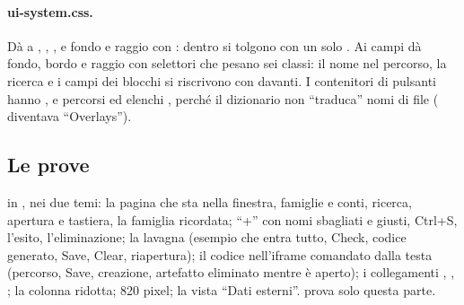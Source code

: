 \paragraph{ui-system.css.} Dà a , ,
,  e  fondo e raggio con
: dentro  si tolgono con un solo
. Ai campi dà fondo, bordo e raggio con selettori che
pesano sei classi: il nome nel percorso, la ricerca e i campi dei blocchi si
riscrivono con  davanti. I contenitori di pulsanti hanno
, e percorsi ed elenchi ,
perché il dizionario non \enquote{traduca} nomi di file
( diventava \enquote{Overlays}).

\subsection{Le prove}

 in , nei due temi: la pagina
che sta nella finestra, famiglie e conti, ricerca, apertura e tastiera, la
famiglia ricordata; \enquote{+} con nomi sbagliati e giusti, Ctrl+S,
l'esito, l'eliminazione; la lavagna (esempio che entra tutto, Check, codice
generato, Save, Clear, riapertura); il codice nell'iframe comandato dalla
testa (percorso, Save, creazione, artefatto eliminato mentre è aperto); i
collegamenti , ,
; la colonna ridotta; 820 pixel; la vista
\enquote{Dati esterni}.  prova solo questa parte.

